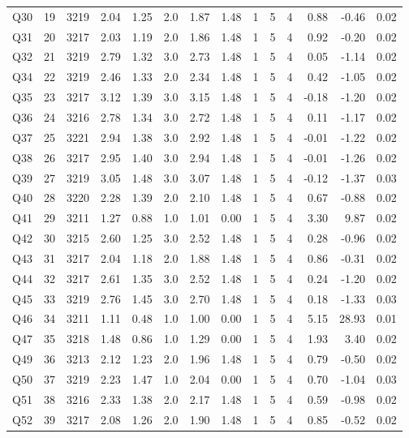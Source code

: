 \documentclass[
]{report}
\begin{document}
\begin{table}
\begin{tabular}[t]{lrrrrrrrrrrrrr}
Q30 & 19 & 3219 & 2.04 & 1.25 & 2.0 & 1.87 & 1.48 & 1 & 5 & 4 & 0.88 & -0.46 & 0.02\\
Q31 & 20 & 3217 & 2.03 & 1.19 & 2.0 & 1.86 & 1.48 & 1 & 5 & 4 & 0.92 & -0.20 & 0.02\\
\addlinespace
Q32 & 21 & 3219 & 2.79 & 1.32 & 3.0 & 2.73 & 1.48 & 1 & 5 & 4 & 0.05 & -1.14 & 0.02\\
Q34 & 22 & 3219 & 2.46 & 1.33 & 2.0 & 2.34 & 1.48 & 1 & 5 & 4 & 0.42 & -1.05 & 0.02\\
Q35 & 23 & 3217 & 3.12 & 1.39 & 3.0 & 3.15 & 1.48 & 1 & 5 & 4 & -0.18 & -1.20 & 0.02\\
Q36 & 24 & 3216 & 2.78 & 1.34 & 3.0 & 2.72 & 1.48 & 1 & 5 & 4 & 0.11 & -1.17 & 0.02\\
Q37 & 25 & 3221 & 2.94 & 1.38 & 3.0 & 2.92 & 1.48 & 1 & 5 & 4 & -0.01 & -1.22 & 0.02\\
\addlinespace
Q38 & 26 & 3217 & 2.95 & 1.40 & 3.0 & 2.94 & 1.48 & 1 & 5 & 4 & -0.01 & -1.26 & 0.02\\
Q39 & 27 & 3219 & 3.05 & 1.48 & 3.0 & 3.07 & 1.48 & 1 & 5 & 4 & -0.12 & -1.37 & 0.03\\
Q40 & 28 & 3220 & 2.28 & 1.39 & 2.0 & 2.10 & 1.48 & 1 & 5 & 4 & 0.67 & -0.88 & 0.02\\
Q41 & 29 & 3211 & 1.27 & 0.88 & 1.0 & 1.01 & 0.00 & 1 & 5 & 4 & 3.30 & 9.87 & 0.02\\
Q42 & 30 & 3215 & 2.60 & 1.25 & 3.0 & 2.52 & 1.48 & 1 & 5 & 4 & 0.28 & -0.96 & 0.02\\
\addlinespace
Q43 & 31 & 3217 & 2.04 & 1.18 & 2.0 & 1.88 & 1.48 & 1 & 5 & 4 & 0.86 & -0.31 & 0.02\\
Q44 & 32 & 3217 & 2.61 & 1.35 & 3.0 & 2.52 & 1.48 & 1 & 5 & 4 & 0.24 & -1.20 & 0.02\\
Q45 & 33 & 3219 & 2.76 & 1.45 & 3.0 & 2.70 & 1.48 & 1 & 5 & 4 & 0.18 & -1.33 & 0.03\\
Q46 & 34 & 3211 & 1.11 & 0.48 & 1.0 & 1.00 & 0.00 & 1 & 5 & 4 & 5.15 & 28.93 & 0.01\\
Q47 & 35 & 3218 & 1.48 & 0.86 & 1.0 & 1.29 & 0.00 & 1 & 5 & 4 & 1.93 & 3.40 & 0.02\\
\addlinespace
Q49 & 36 & 3213 & 2.12 & 1.23 & 2.0 & 1.96 & 1.48 & 1 & 5 & 4 & 0.79 & -0.50 & 0.02\\
Q50 & 37 & 3219 & 2.23 & 1.47 & 1.0 & 2.04 & 0.00 & 1 & 5 & 4 & 0.70 & -1.04 & 0.03\\
Q51 & 38 & 3216 & 2.33 & 1.38 & 2.0 & 2.17 & 1.48 & 1 & 5 & 4 & 0.59 & -0.98 & 0.02\\
Q52 & 39 & 3217 & 2.08 & 1.26 & 2.0 & 1.90 & 1.48 & 1 & 5 & 4 & 0.85 & -0.52 & 0.02\\

\end{tabular}
\end{table}
\end{document}

